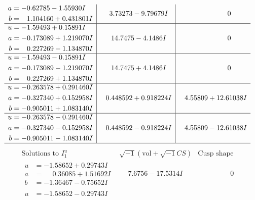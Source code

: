 \documentclass[1p]{elsarticle_modified}
\theoremstyle{definition}
\newcommand{\I}{\sqrt{-1}}
\begin{document}
$$\begin{array}{c|c|c}
\begin{aligned}
a &= -0.62785 - 1.55930 I \\
b &= \phantom{-}1.104160 + 0.431801 I\end{aligned}
 & \phantom{-}3.73273 - 9.79679 I & \phantom{-0.000000 } 0 \\ \hline\begin{aligned}
u &= -1.59493 + 0.15891 I \\
a &= -0.173089 + 1.219070 I \\
b &= \phantom{-}0.227269 - 1.134870 I\end{aligned}
 & \phantom{-}14.7475 - 4.1486 I & \phantom{-0.000000 } 0 \\ \hline\begin{aligned}
u &= -1.59493 - 0.15891 I \\
a &= -0.173089 - 1.219070 I \\
b &= \phantom{-}0.227269 + 1.134870 I\end{aligned}
 & \phantom{-}14.7475 + 4.1486 I & \phantom{-0.000000 } 0 \\ \hline\begin{aligned}
u &= -0.263578 + 0.291460 I \\
a &= -0.327340 + 0.152958 I \\
b &= -0.905011 + 1.083140 I\end{aligned}
 & \phantom{-}0.448592 + 0.918224 I & \phantom{-}4.55809 + 12.61038 I \\ \hline\begin{aligned}
u &= -0.263578 - 0.291460 I \\
a &= -0.327340 - 0.152958 I \\
b &= -0.905011 - 1.083140 I\end{aligned}
 & \phantom{-}0.448592 - 0.918224 I & \phantom{-}4.55809 - 12.61038 I\\
 \hline 
 \end{array}$$\newpage$$\begin{array}{c|c|c}  
\text{Solutions to }I^u_{1}& \I (\text{vol} + \sqrt{-1}CS) & \text{Cusp shape}\\
 \hline 
\begin{aligned}
u &= -1.58652 + 0.29743 I \\
a &= \phantom{-}0.36085 + 1.51692 I \\
b &= -1.36467 - 0.75652 I\end{aligned}
 & \phantom{-}7.6756 - 17.5314 I & \phantom{-0.000000 } 0 \\ \hline\begin{aligned}
u &= -1.58652 - 0.29743 I \\

\end{aligned}
\end{array}$$
\end{document}

